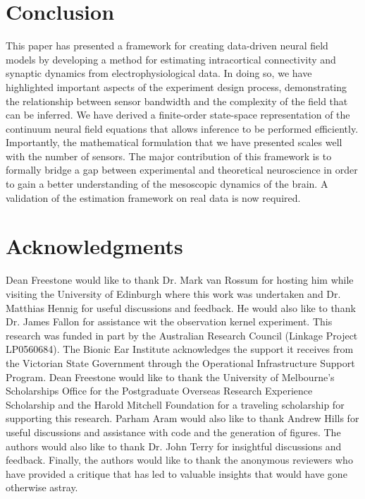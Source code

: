 \documentclass[review,authoryear,3p]{elsarticle}
\begin{document}


\section{Conclusion}
This paper has presented a framework for creating data-driven neural field models by developing a method for estimating intracortical connectivity and synaptic dynamics from electrophysiological data. In doing so, we have highlighted important aspects of the experiment design process, demonstrating the relationship between sensor bandwidth and the complexity of the field that can be inferred. We have derived a finite-order state-space representation of the continuum neural field equations that allows inference to be performed efficiently. Importantly, the mathematical formulation that we have presented scales well with the number of sensors. The major contribution of this framework is to formally bridge a gap between experimental and theoretical neuroscience in order to gain a better understanding of the mesoscopic dynamics of the brain. A validation of the estimation framework on real data is now required.

\section{Acknowledgments}
Dean Freestone would like to thank Dr. Mark van Rossum for hosting him while visiting the University of Edinburgh where this work was undertaken and Dr. Matthias Hennig for useful discussions and feedback. He would also like to thank Dr. James Fallon for assistance wit the observation kernel experiment. This research was funded in part by the Australian Research Council (Linkage Project LP0560684). The Bionic Ear Institute acknowledges the support it receives from the Victorian State Government through the Operational Infrastructure Support Program. Dean Freestone would like to thank the University of Melbourne's Scholarships Office for the Postgraduate Overseas Research Experience Scholarship and the Harold Mitchell Foundation for a traveling scholarship for supporting this research. Parham Aram would also like to thank Andrew Hills for useful discussions and assistance with code and the generation of figures. The authors would also like to thank Dr. John Terry for insightful discussions and feedback. Finally, the authors would like to thank the anonymous reviewers who have provided a critique that has led to valuable insights that would have gone otherwise astray.
\end{document}
